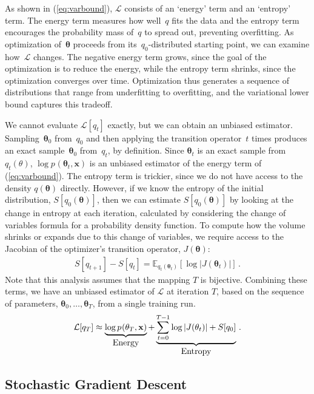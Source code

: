 \documentclass[]{article}
\newcommand{\vx}{\mathbf{x}}
\newcommand{\expectargs}[2]{\mathbb{E}_{#1} \left[ {#2} \right]}
\newcommand{\varL}{\mathcal{L}}
\newcommand{\data}{\vx}
\newcommand{\params}{\mathbf{\theta}}
\newcommand{\subjointdist}[2]{p_{#1}(\params_{#2} , \data)}
\begin{document}
As shown in (\ref{eq:varbound}), $\varL$ consists of an `energy' term and an `entropy' term.
The energy term measures how well~$q$ fits the data and the entropy term encourages the probability mass of~$q$ to spread out, preventing overfitting.
As optimization of~$\params$ proceeds from its~$q_0$-distributed starting point, we can examine how~$\varL$ changes.
The negative energy term grows, since the goal of the optimization is to reduce the energy, while the entropy term shrinks, since the optimization converges over time.
Optimization thus generates a sequence of distributions that range from underfitting to overfitting, and the variational lower bound captures this tradeoff.

We cannot evaluate $\varL[q_t]$ exactly, but we can obtain an unbiased estimator.
Sampling~$\params_0$ from~$q_0$ and then applying the transition operator~$t$ times produces an exact sample~$\params_0$ from~$q_t$, by definition.
Since $\params_t$ is an exact sample from $q_t(\theta)$, $\log\subjointdist{}{t}$ is an unbiased estimator of the energy term of (\ref{eq:varbound}).
The entropy term is trickier, since we do not have access to the density $q(\params)$ directly.
However, if we know the entropy of the initial distribution, $S[q_0(\params)]$, then we can estimate $S[q_0(\params)]$ by looking at the change in entropy at each iteration, calculated by considering the change of variables formula for a probability density function.
To compute how the volume shrinks or expands due to this change of variables, we require access to the Jacobian of the optimizer's transition operator, $J(\params)$:
%
\begin{align}
S[q_{t+1}] - S[q_t] =
  \expectargs{q_t(\params_t)}{\log
    \left| J(\params_t) \right|} \,.
\end{align}
%
Note that this analysis assumes that the mapping $T$ is bijective.
Combining these terms, we have an unbiased estimator of $\varL$ at iteration $T$,
based on the sequence of parameters, $\params_0, \ldots, \params_T$, from a single training run.
\begin{align}
\varL[q_T] \approx
  \underbrace{\log \subjointdist{}{T}}_{\textnormal{\normalsize Energy}} +
  \underbrace{\sum_{t=0}^{T-1} \log \left| J(\params_t) \right| + S[q_0]}_{\textnormal{\normalsize Entropy}} \,.
\label{eq:entropy-bound}
\end{align}

\subsection{Stochastic Gradient Descent}
\end{document}
